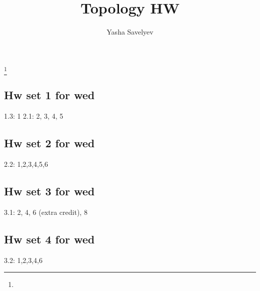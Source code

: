 \documentclass{amsart}
\numberwithin{equation}{section}
\theoremstyle{definition}
\theoremstyle{remark}
\begin{document}
\title{Topology HW}
\author{Yasha Savelyev}
\thanks {}
\maketitle
\subsection{Hw set 1 for wed}
1.3: 1  
2.1: 2, 3, 4, 5  
\subsection{Hw set 2 for wed}
2.2: 1,2,3,4,5,6
\subsection{Hw set 3 for wed}
3.1: 2, 4, 6 (extra credit), 8
\subsection{Hw set 4 for wed}
3.2: 1,2,3,4,6
\end{document}

